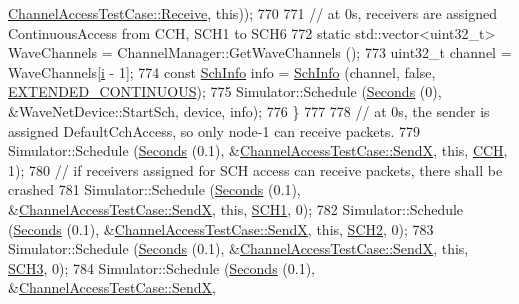 \begin{DoxyCode}
      \hyperlink{classChannelAccessTestCase_ae5b3299c80154aa10c3775bfc4f8c0ab}{ChannelAccessTestCase::Receive}, \textcolor{keyword}{this}));
770 
771         \textcolor{comment}{// at 0s, receivers are assigned ContinuousAccess from CCH, SCH1 to SCH6}
772         \textcolor{keyword}{static} std::vector<uint32\_t> WaveChannels = ChannelManager::GetWaveChannels ();
773         uint32\_t channel = WaveChannels[\hyperlink{bernuolliDistribution_8m_a6f6ccfcf58b31cb6412107d9d5281426}{i} - 1];
774         \textcolor{keyword}{const} \hyperlink{structns3_1_1SchInfo}{SchInfo} info = \hyperlink{structns3_1_1SchInfo}{SchInfo} (channel, \textcolor{keyword}{false}, 
      \hyperlink{channel-scheduler_8h_a51fe3e802b9451e2893d55d591047fc1}{EXTENDED\_CONTINUOUS});
775         Simulator::Schedule (\hyperlink{group__timecivil_ga33c34b816f8ff6628e33d5c8e9713b9e}{Seconds} (0), &WaveNetDevice::StartSch, device, info);
776       \}
777 
778     \textcolor{comment}{// at 0s, the sender is assigned DefaultCchAccess, so only node-1 can receive packets.}
779     Simulator::Schedule (\hyperlink{group__timecivil_ga33c34b816f8ff6628e33d5c8e9713b9e}{Seconds} (0.1), &\hyperlink{classChannelAccessTestCase_a372d321c372c644c86ff355e94704eaf}{ChannelAccessTestCase::SendX}, \textcolor{keyword}{
      this}, \hyperlink{channel-manager_8h_a52d2f169cde2f6abe66ecc83f0d7ad80}{CCH}, 1);
780     \textcolor{comment}{// if receivers assigned for SCH access can receive packets, there shall be crashed}
781     Simulator::Schedule (\hyperlink{group__timecivil_ga33c34b816f8ff6628e33d5c8e9713b9e}{Seconds} (0.1), &\hyperlink{classChannelAccessTestCase_a372d321c372c644c86ff355e94704eaf}{ChannelAccessTestCase::SendX}, \textcolor{keyword}{
      this}, \hyperlink{channel-manager_8h_a456a1b730523e5d3b8a29fb227d10028}{SCH1}, 0);
782     Simulator::Schedule (\hyperlink{group__timecivil_ga33c34b816f8ff6628e33d5c8e9713b9e}{Seconds} (0.1), &\hyperlink{classChannelAccessTestCase_a372d321c372c644c86ff355e94704eaf}{ChannelAccessTestCase::SendX}, \textcolor{keyword}{
      this}, \hyperlink{channel-manager_8h_a07a0bff852fe2b8538a46d6e779546b6}{SCH2}, 0);
783     Simulator::Schedule (\hyperlink{group__timecivil_ga33c34b816f8ff6628e33d5c8e9713b9e}{Seconds} (0.1), &\hyperlink{classChannelAccessTestCase_a372d321c372c644c86ff355e94704eaf}{ChannelAccessTestCase::SendX}, \textcolor{keyword}{
      this}, \hyperlink{channel-manager_8h_ad3135bbb37bccc4d3d6a2bf4545cf7a5}{SCH3}, 0);
784     Simulator::Schedule (\hyperlink{group__timecivil_ga33c34b816f8ff6628e33d5c8e9713b9e}{Seconds} (0.1), &\hyperlink{classChannelAccessTestCase_a372d321c372c644c86ff355e94704eaf}{ChannelAccessTestCase::SendX}, \textcolor{keyword}{
}
\end{DoxyCode}
